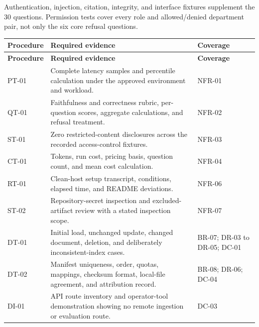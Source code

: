 \documentclass[11pt,letterpaper]{article}
\begin{document}
\endgroup

Authentication, injection, citation, integrity, and interface fixtures supplement the 30 questions. Permission tests cover every role and allowed/denied department pair, not only the six core refusal questions.\par

\begingroup\small

\begin{longtable}{|P{\arrayrulewidth\relax}|P{\arrayrulewidth\relax}|P{\arrayrulewidth\relax}|}

\hline{}

\textbf{Procedure} & \textbf{Required evidence} & \textbf{Coverage} \\ \hline

\endfirsthead

\hline{}

\textbf{Procedure} & \textbf{Required evidence} & \textbf{Coverage} \\ \hline

\endhead

\hline\endfoot

\hline\endlastfoot

PT-01 & Complete latency samples and percentile calculation under the approved environment and workload. & NFR-01 \\ \hline

QT-01 & Faithfulness and correctness rubric, per-question scores, aggregate calculations, and refusal treatment. & NFR-02 \\ \hline

ST-01 & Zero restricted-content disclosures across the recorded access-control fixtures. & NFR-03 \\ \hline

CT-01 & Tokens, run cost, pricing basis, question count, and mean cost calculation. & NFR-04 \\ \hline

RT-01 & Clean-host setup transcript, conditions, elapsed time, and README deviations. & NFR-06 \\ \hline

ST-02 & Repository-secret inspection and excluded-artifact review with a stated inspection scope. & NFR-07 \\ \hline

DT-01 & Initial load, unchanged update, changed document, deletion, and deliberately inconsistent-index cases. & BR-07; DR-03 to DR-05; DC-01 \\ \hline

DT-02 & Manifest uniqueness, order, quotas, mappings, checksum format, local-file agreement, and attribution record. & BR-08; DR-06; DC-04 \\ \hline

DI-01 & API route inventory and operator-tool demonstration showing no remote ingestion or evaluation route. & DC-03 \\ \hline

\end{longtable}
\end{document}
